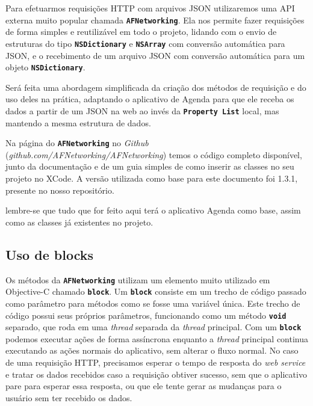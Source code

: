 \documentclass[a4paper,12pt,brazil,doubleside]{book}
\begin{document}
\begin{singlespace}
\begin{framed}
\end{framed}



Para efetuarmos requisições HTTP com arquivos JSON utilizaremos uma API externa muito popular chamada \texttt{\textbf{AFNetworking}}. Ela nos permite fazer requisições de forma simples e reutilizável em todo o projeto, lidando com o envio de estruturas do tipo \texttt{\textbf{NSDictionary}} e \texttt{\textbf{NSArray}} com conversão automática para JSON, e o recebimento de um arquivo JSON com conversão automática para um objeto \texttt{\textbf{NSDictionary}}.

Será feita uma abordagem simplificada da criação dos métodos de requisição e do uso deles na prática, adaptando o aplicativo de Agenda para que ele receba os dados a partir de um JSON na web ao invés da \texttt{\textbf{Property List}} local, mas mantendo a mesma estrutura de dados.

Na página do \texttt{\textbf{AFNetworking}} no \emph{Github} (\textit{github.com/AFNetworking/AFNetworking}) temos o código completo disponível, junto da documentação e de um guia simples de como inserir as classes no seu projeto no XCode. A versão utilizada como base para este documento foi 1.3.1, presente no nosso repositório.

lembre-se que tudo que for feito aqui terá o aplicativo Agenda como base, assim como as classes já existentes no projeto.

\subsection{Uso de blocks}


Os métodos da \texttt{\textbf{AFNetworking}} utilizam um elemento muito utilizado em Objective-C chamado \texttt{\textbf{block}}. Um \texttt{\textbf{block}} consiste em um trecho de código passado como parâmetro para métodos como se fosse uma variável única. Este trecho de código possui seus próprios parâmetros, funcionando como um método \texttt{\textbf{void}} separado, que roda em uma \emph{thread} separada da \emph{thread} principal. Com um \texttt{\textbf{block}} podemos executar ações de forma assíncrona enquanto a \emph{thread} principal continua executando as ações normais do aplicativo, sem alterar o fluxo normal. No caso de uma requisição HTTP, precisamos esperar o tempo de resposta do \emph{web service} e tratar os dados recebidos caso a requisição obtiver sucesso, sem que o aplicativo pare para esperar essa resposta, ou que ele tente gerar as mudanças para o usuário sem ter recebido os dados.


\end{singlespace}
\end{document}
